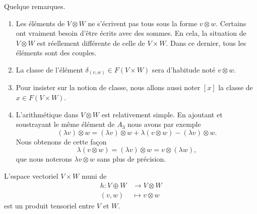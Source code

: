 \begin{remark}      \label{REMooSLEGooWEiutz}
    Quelque remarques.
    \begin{enumerate}
        \item
            Les éléments de \( V\otimes W\) ne s'écrivent pas tous sous la forme \( v\otimes w\). Certains ont vraiment besoin d'être écrits avec des sommes. En cela, la situation de \( V\otimes W\) est réellement différente de celle de \( V\times W\). Dans ce dernier, tous les éléments sont des couples.
        \item
            La classe de l'élément \( \delta_{(v,w)}\in F(V\times W)\) sera d'habitude noté \( v\otimes w\).
        \item
            Pour insister sur la notion de classe, nous allons aussi noter \( [x]\) la classe de \( x\in F(V\times W)\).
        \item       \label{ITEMooPVWHooMkgQoT}
            L'arithmétique dans \( V\otimes W\) est relativement simple. En ajoutant et soustrayant le même élément de \( A_3\) nous avons par exemple
            \begin{equation}
                (\lambda v)\otimes w=(\lambda v)\otimes w+\lambda (v\otimes w)-(\lambda v)\otimes w.
            \end{equation}
            Nous obtenons de cette façon
            \begin{equation}
                \lambda(v\otimes w)=(\lambda v)\otimes w=v\otimes (\lambda w),
            \end{equation}
            que nous noterons \( \lambda v\otimes w\) sans plus de précision.
    \end{enumerate}
\end{remark}

\begin{proposition}     \label{PROPooIWZDooRRZNCf}
    L'espace vectoriel \( V\times W\) muni de
    \begin{equation}
        \begin{aligned}
            h\colon V\oplus W&\to V\otimes W \\
            (v,w) &\mapsto v\otimes w 
        \end{aligned}
    \end{equation}
    est un produit tensoriel entre \( V\) et \( W\).
\end{proposition}

